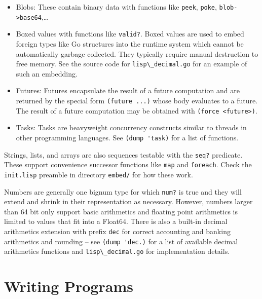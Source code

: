 \documentclass[
]{article}
\newcommand{\passthrough}[1]{#1}
\begin{document}
\begin{itemize}
\item
  Blobs: These contain binary data with functions like
  \passthrough{\lstinline!peek!}, \passthrough{\lstinline!poke!},
  \passthrough{\lstinline!blob->base64!},\ldots{}
\item
  Boxed values with functions like \passthrough{\lstinline!valid?!}.
  Boxed values are used to embed foreign types like Go structures into
  the runtime system which cannot be automatically garbage collected.
  They typically require manual destruction to free memory. See the
  source code for \passthrough{\lstinline!lisp\_decimal.go!} for an
  example of such an embedding.
\item
  Futures: Futures encapsulate the result of a future computation and
  are returned by the special form
  \passthrough{\lstinline!(future ...)!} whose body evaluates to a
  future. The result of a future computation may be obtained with
  \passthrough{\lstinline!(force <future>)!}.
\item
  Tasks: Tasks are heavyweight concurrency constructs similar to threads
  in other programming languages. See
  \passthrough{\lstinline!(dump 'task)!} for a list of functions.
\end{itemize}

Strings, lists, and arrays are also sequences testable with the
\passthrough{\lstinline!seq?!} predicate. These support convenience
successor functions like \passthrough{\lstinline!map!} and
\passthrough{\lstinline!foreach!}. Check the
\passthrough{\lstinline!init.lisp!} preamble in directory
\passthrough{\lstinline!embed/!} for how these work.

Numbers are generally one bignum type for which
\passthrough{\lstinline!num?!} is true and they will extend and shrink
in their representation as necessary. However, numbers larger than 64
bit only support basic arithmetics and floating point arithmetics is
limited to values that fit into a Float64. There is also a built-in
decimal arithmetics extension with prefix \passthrough{\lstinline!dec!}
for correct accounting and banking arithmetics and rounding -- see
\passthrough{\lstinline!(dump 'dec.)!} for a list of available decimal
arithmetics functions and \passthrough{\lstinline!lisp\_decimal.go!} for
implementation details.

\hypertarget{writing-programs}{%
\section{Writing Programs}\label{writing-programs}}
\end{document}
